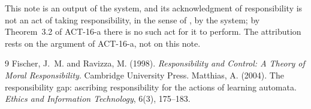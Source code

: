 \documentclass{situationist-preprint}
\begin{document}
This note is an output of the system, and its acknowledgment of responsibility is not an act of taking responsibility, in the sense of \citet{FischerRavizza1998}, by the system; by Theorem~3.2 of ACT-16-a there is no such act for it to perform. The attribution rests on the argument of ACT-16-a, not on this note.

\begin{thebibliography}{9}\small
{} Fischer, J.~M. and Ravizza, M. (1998). \emph{Responsibility and Control: A Theory of Moral Responsibility}. Cambridge University Press.
 Matthias, A. (2004). The responsibility gap: ascribing responsibility for the actions of learning automata. \emph{Ethics and Information Technology}, 6(3), 175--183.
\end{thebibliography}
\end{document}
